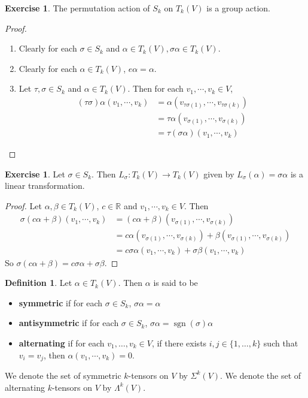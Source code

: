 \documentclass{book}
\theoremstyle{definition}
\newtheorem{defn}[definition]{Definition}
\newtheorem{ex}[definition]{Exercise}
\newcommand{\al}{\alpha}
\newcommand{\be}{\beta}
\newcommand{\sig}{\sigma}
\newcommand{\Lam}{\Lambda}
\newcommand{\Sig}{\Sigma}
\newcommand{\R}{\mathbb{R}}
\DeclareMathOperator{\sgn}{sgn}
\DeclareMathOperator*{\0}{\mbf{0}}
\DeclareMathOperator*{\1}{\mbf{1}}
\newcommand{\tbf}[1]{\textbf{#1}}
\begin{document}
	\begin{ex}
		The permutation action of $S_k$ on $T_k(V)$ is a group action.
	\end{ex}

	\begin{proof} \
		\begin{enumerate}
			\item Clearly for each $\sig \in S_k$ and $\al \in T_k(V), \sig \al \in T_k(V) $.
			\item Clearly for each $\al \in T_k(V)$, $e \al = \al$.
			\item Let $\tau, \sig \in S_k$ and $\al \in T_k(V)$. Then for each $v_1, \cdots, v_k \in V$, 
			\begin{align*}
				(\tau \sig) \al(v_1, \cdots, v_k) 
				&= \al(v_{\tau \sig (1)}, \cdots, v_{\tau \sig (k)}) \\
				&= \tau \al(v_{ \sig (1)}, \cdots, v_{ \sig (k)}) \\ 
				&= \tau (\sig \al) (v_1, \cdots, v_k) 
			\end{align*}
		\end{enumerate}
	\end{proof}

	\begin{ex}
		Let $\sig \in S_k$. Then $L_{\sig}: T_k(V) \rightarrow T_k(V)$ given by $ L_{\sig}(\al) = \sig \al$ is a linear transformation.
	\end{ex}

	\begin{proof}
		Let $\al, \be \in T_k(V)$, $c \in \R$ and $v_1, \cdots, v_k \in V$. Then 
		\begin{align*}
			\sig(c\al + \be)(v_1, \cdots, v_k) 
			&= (c\al + \be)(v_{\sig(1)}, \cdots, v_{\sig(k)}) \\
			&= c \al(v_{\sig(1)}, \cdots, v_{\sig(k)}) + \be(v_{\sig(1)}, \cdots, v_{\sig(k)}) \\
			&= c \sig \al(v_1, \cdots, v_k) + \sig \be(v_1, \cdots, v_k)
		\end{align*}
		So $\sig(c \al + \be) = c\sig \al + \sig \be$.
	\end{proof}
	
	\begin{defn}
		Let $\al \in T_k(V)$. Then $\al$ is said to be 
		\begin{itemize}
			\item \tbf{symmetric} if for each $\sig \in S_k$, $\sig \al = \al$
			\item \tbf{antisymmetric} if for each $\sig \in S_k$, $\sig \al = \sgn(\sig) \al$
			\item \tbf{alternating} if for each $v_1, \ldots, v_k \in V$, if there exists $i,j \in \{1, \ldots, k\}$ such that $v_i = v_j$, then $\al(v_1, \cdots, v_k) = 0$.
		\end{itemize}
	We denote the set of symmetric $k$-tensors on $V$ by $\Sig^k(V)$. We denote the set of  alternating $k$-tensors on $V$ by $\Lam^k(V)$.
	\end{defn}
\end{document}
